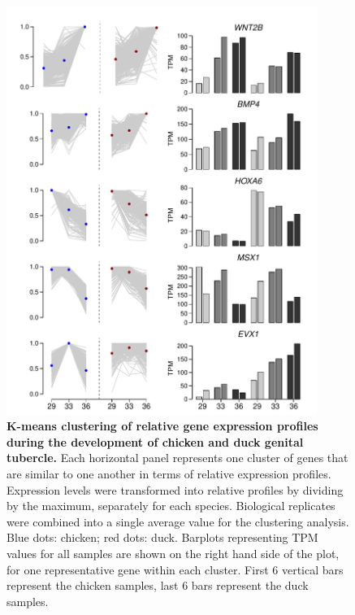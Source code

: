 \begin{figure}[hbt!]
 \centering
 \includegraphics[width=0.9\textwidth, page=1] {figures/IPLOSS/IPLOSS_Figure2.pdf}
 \caption[K-means clustering of relative expression profiles (clusters with similar behavior between chicken and duck).]{
 \textbf{K-means clustering of relative gene expression profiles during the development of chicken and duck genital tubercle.} Each horizontal panel represents one cluster of genes that are similar to one another in terms of relative expression profiles. Expression levels were transformed into relative profiles by dividing by the maximum, separately for each species. Biological replicates were combined into a single average value for the clustering analysis. Blue dots: chicken; red dots: duck. Barplots representing TPM values for all samples are shown on the right hand side of the plot, for one representative gene within each cluster. First 6 vertical bars represent the chicken samples, last 6 bars represent the duck samples.\\
 }
 \label{fig:IPLOSS-fig2}
\end{figure} 

